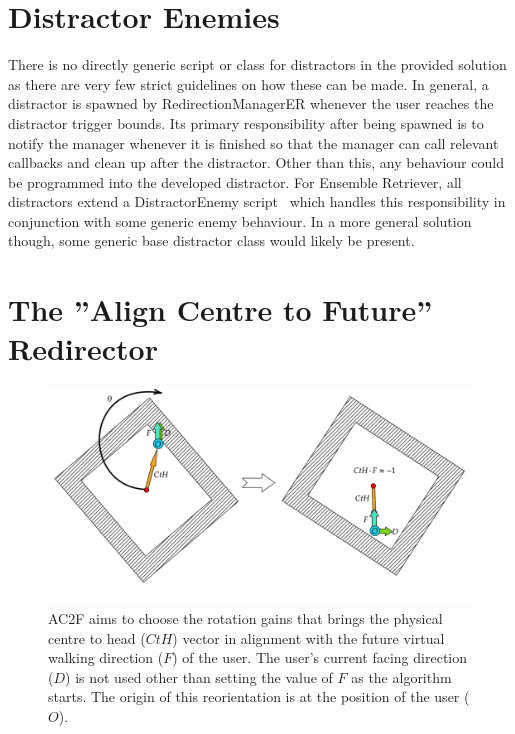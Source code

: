 \section{Distractor Enemies}
There is no directly generic script or class for distractors in the provided solution as there are very few strict guidelines on how these can be made. In general, a distractor is spawned by RedirectionManagerER whenever the user reaches the distractor trigger bounds. Its primary responsibility after being spawned is to notify the manager whenever it is finished so that the manager can call relevant callbacks and clean up after the distractor. Other than this, any behaviour could be programmed into the developed distractor. For Ensemble Retriever, all distractors extend a DistractorEnemy script~\cite{distractorEnemyScript} which handles this responsibility in conjunction with some generic enemy behaviour. In a more general solution though, some generic base distractor class would likely be present.

\section{The ''Align Centre to Future'' Redirector}
\begin{figure}[htbp]
  \centering
  \includegraphics[width=\textwidth]{figures/graphs/AC2F.png}
  \caption[Align Centre to Future Algorithm Example]{AC2F aims to choose the rotation gains that brings the physical centre to head ($CtH$) vector in alignment with the future virtual walking direction ($F$) of the user. The user's current facing direction ($D$) is not used other than setting the value of $F$ as the algorithm starts. The origin of this reorientation is at the position of the user ($O$).}
  \label{fig:ac2f}
\end{figure}

